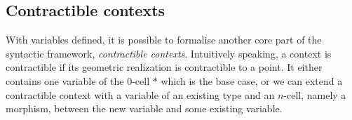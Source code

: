 \documentclass{sig-alternate}
\begin{document}
\subsection{Contractible contexts}

With variables defined, it is possible to formalise another core part of the syntactic framework, \emph{contractible
contexts}. Intuitively speaking, a context is contractible if its geometric
realization is contractible to a point. It either contains one variable of the 0-cell $*$ which is the base case, or we can extend a contractible context with a
variable of an existing type and an $n$-cell, namely a morphism, between the new variable and some existing variable.

\begin{code}\>\<%
\\
\>  \<%
\\
\>[0]\<[2]%
\>[2] \<[7]%
\>[7]\AgdaSymbol{:}  \AgdaSymbol{(} \AgdaInductiveConstructor{,} \AgdaInductiveConstructor{*}\AgdaSymbol{)}\<%
\\
\>[0]\<[2]%
\>[2] \<[7]%
\>[7]\AgdaSymbol{:} \AgdaSymbol{\}}     \AgdaSymbol{\{} \AgdaSymbol{:}  \AgdaSymbol{\}(} \AgdaSymbol{:}  \AgdaSymbol{)} \<[50]%
\>[50]\<%
\\
\>[2]\<[7]%
\>[7]  \AgdaSymbol{(} \AgdaInductiveConstructor{,}  \AgdaInductiveConstructor{,} \AgdaSymbol{(} \AgdaSymbol{(} \AgdaSymbol{)}   \AgdaSymbol{))} \<[54]%
\>[54]\<%
\\
\>\<\end{code}
\end{document}
